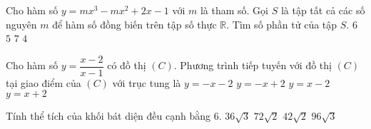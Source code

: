 \begin{ex}%
	Cho hàm số $y=mx^3-mx^2+2x-1$ với $m$ là tham số. Gọi $S$ là tập tất cả các số nguyên $m$ để hàm số đồng biến trên tập số thực $\mathbb{R}$. Tìm số phần tử của tập $S.$
	\choice
	{$6$}
	{$5$}
	{\True $7$}
	{$4$}
\end{ex}
\begin{ex}%
	Cho hàm số $y=\dfrac{x-2}{x-1}$ có đồ thị $(C)$. Phương trình tiếp tuyến với đồ thị $(C)$ tại giao điểm của $(C)$ với trục tung là
	\choice
	{$y=-x-2$}
	{$y=-x+2$}
	{$y=x-2$}
	{\True $y=x+2$}
\end{ex}
\begin{ex}%
	Tính thể tích của khối bát diện đều cạnh bằng 6.
	\choice
	{$36\sqrt{3}$}
	{$72\sqrt{2}$}
	{$42\sqrt{2}$}
	{\True $96\sqrt{3}$}
\end{ex}
